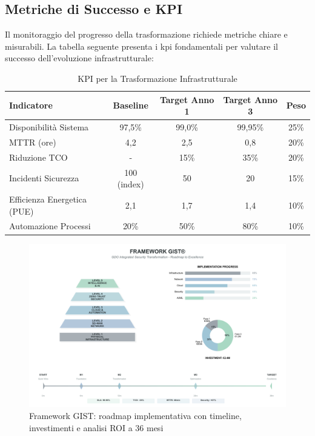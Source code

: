 \subsection{\texorpdfstring{Metriche di Successo e KPI}{3.9.2 - Metriche di Successo e KPI}}
\label{subsec:success_metrics}

Il monitoraggio del progresso della trasformazione richiede metriche chiare e misurabili. La tabella seguente presenta i \gls{kpi} fondamentali per valutare il successo dell'evoluzione infrastrutturale:

\begin{table}[htbp]
\centering
\caption{KPI per la Trasformazione Infrastrutturale}
\label{tab:transformation_kpi}
\small
\sffamily
\begin{tabularx}{\textwidth}{X c c c c}
\toprule
\textbf{Indicatore} & \textbf{Baseline} & \textbf{Target Anno 1} & \textbf{Target Anno 3} & \textbf{Peso} \\
\midrule
Disponibilità Sistema & 97,5\% & 99,0\% & 99,95\% & 25\% \\
MTTR (ore) & 4,2 & 2,5 & 0,8 & 20\% \\
Riduzione TCO & - & 15\% & 35\% & 20\% \\
Incidenti Sicurezza & 100 (index) & 50 & 20 & 15\% \\
Efficienza Energetica (PUE) & 2,1 & 1,7 & 1,4 & 10\% \\
Automazione Processi & 20\% & 50\% & 80\% & 10\% \\
\bottomrule
\end{tabularx}
\end{table}

\begin{figure}[htbp]
\centering
\includegraphics[width=1.1\textwidth]{thesis_figures/cap3/figura_3_5_corrected.pdf}
\caption{Framework GIST: roadmap implementativa con timeline, investimenti e analisi ROI a 36 mesi}
\label{fig:gist_framework_roadmap}
\end{figure}

